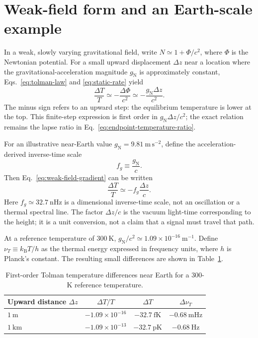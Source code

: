 \documentclass[12pt]{article}
\begin{document}
\section{Weak-field form and an Earth-scale example}

In a weak, slowly varying gravitational field, write $N\simeq1+\Phi/c^2$, where $\Phi$ is the Newtonian potential. For a small upward displacement $\Delta z$ near a location where the gravitational-acceleration magnitude $g_{\mathrm{N}}$ is approximately constant, Eqs.~\eqref{eq:tolman-law} and \eqref{eq:static-rate} yield
\begin{equation}
  \frac{\Delta T}{T}
  \simeq-\frac{\Delta\Phi}{c^2}
  \simeq-\frac{g_{\mathrm{N}}\Delta z}{c^2}.
  \label{eq:weak-field-gradient}
\end{equation}
The minus sign refers to an upward step: the equilibrium temperature is lower at the top. This finite-step expression is first order in $g_{\mathrm{N}}\Delta z/c^2$; the exact relation remains the lapse ratio in Eq.~\eqref{eq:endpoint-temperature-ratio}.

For an illustrative near-Earth value $g_{\mathrm{N}}=9.81\ \mathrm{m\,s^{-2}}$, define the acceleration-derived inverse-time scale
\begin{equation}
  f_g\equiv\frac{g_{\mathrm{N}}}{c}.
  \label{eq:gravity-frequency-scale}
\end{equation}
Then Eq.~\eqref{eq:weak-field-gradient} can be written
\begin{equation}
  \frac{\Delta T}{T}
  \simeq-f_g\frac{\Delta z}{c}.
  \label{eq:frequency-lighttime-product}
\end{equation}
Here $f_g\simeq32.7\ \mathrm{nHz}$ is a dimensional inverse-time scale, not an oscillation or a thermal spectral line. The factor $\Delta z/c$ is the vacuum light-time corresponding to the height; it is a unit conversion, not a claim that a signal must travel that path.

At a reference temperature of $300\ \mathrm{K}$, $g_{\mathrm{N}}/c^2\simeq1.09\times10^{-16}\ \mathrm{m^{-1}}$. Define $\nu_T\equiv k_{\mathrm{B}}T/h$ as the thermal energy expressed in frequency units, where $h$ is Planck's constant. The resulting small differences are shown in Table~\ref{tab:earth-scale}.
\begin{table}[ht]
  \centering
  \caption{First-order Tolman temperature differences near Earth for a 300-K reference temperature.}
  \label{tab:earth-scale}
  \begin{tabular}{lccc}
    \toprule
    Upward distance $\Delta z$ & $\Delta T/T$ & $\Delta T$ & $\Delta\nu_T$ \\
    \midrule
    $1\ \mathrm{m}$ & $-1.09\times10^{-16}$ & $-32.7\ \mathrm{fK}$ & $-0.68\ \mathrm{mHz}$ \\
    $1\ \mathrm{km}$ & $-1.09\times10^{-13}$ & $-32.7\ \mathrm{pK}$ & $-0.68\ \mathrm{Hz}$ \\
    \bottomrule
  \end{tabular}
\end{table}
\end{document}
